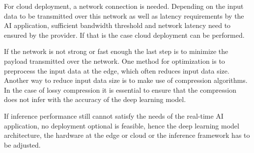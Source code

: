 For cloud deployment, a network connection is needed. Depending on the input data to be transmitted over this network as well as latency requirements by the AI application, sufficient bandwidth threshold and network latency need to ensured by the provider. 
If that is the case cloud deployment can be performed.

If the network is not strong or fast enough the last step is to minimize the payload transmitted over the network.
One method for optimization is to preprocess the input data at the edge, which often reduces input data size. 
Another way to reduce input data size is to make use of compression algorithms.
In the case of lossy compression it is essential to ensure that the compression does not infer with the accuracy of the deep learning model.

If inference performance still cannot satisfy the needs of the real-time AI application, no deployment optional is feasible, hence the deep learning model architecture, the hardware at the edge or cloud or the inference framework has to be adjusted.





